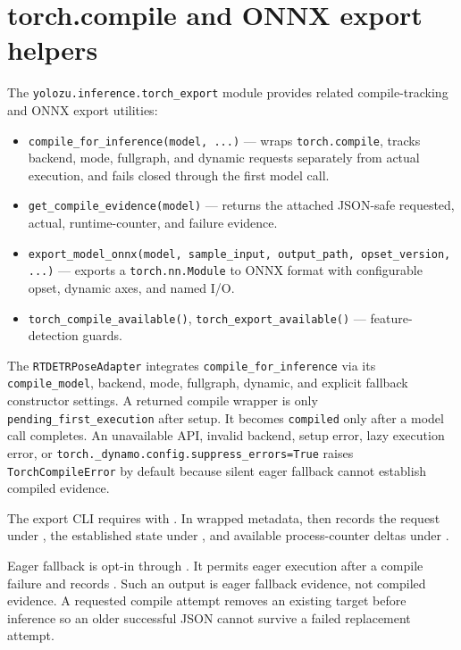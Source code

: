 \section{torch.compile and ONNX export helpers}
The \texttt{yolozu.inference.torch\_export} module provides related compile-tracking and ONNX export utilities:

\begin{itemize}
  \item \texttt{compile\_for\_inference(model, ...)} --- wraps \texttt{torch.compile}, tracks backend, mode, fullgraph, and dynamic requests separately from actual execution, and fails closed through the first model call.
  \item \texttt{get\_compile\_evidence(model)} --- returns the attached JSON-safe requested, actual, runtime-counter, and failure evidence.
  \item \texttt{export\_model\_onnx(model, sample\_input, output\_path, opset\_version, ...)} --- exports a \texttt{torch.nn.Module} to ONNX format with configurable opset, dynamic axes, and named I/O.
  \item \texttt{torch\_compile\_available()}, \texttt{torch\_export\_available()} --- feature-detection guards.
\end{itemize}

The \texttt{RTDETRPoseAdapter} integrates \texttt{compile\_for\_inference} via its \texttt{compile\_model}, backend, mode, fullgraph, dynamic, and explicit fallback constructor settings. A returned compile wrapper is only \texttt{pending\_first\_execution} after setup. It becomes \texttt{compiled} only after a model call completes. An unavailable API, invalid backend, setup error, lazy execution error, or \texttt{torch.\_dynamo.config.suppress\_errors=True} raises \texttt{TorchCompileError} by default because silent eager fallback cannot establish compiled evidence.

The export CLI requires  with . In wrapped metadata,  then  records the request under , the established state under , and available  process-counter deltas under .

Eager fallback is opt-in through . It permits eager execution after a compile failure and records . Such an output is eager fallback evidence, not compiled evidence. A requested compile attempt removes an existing target before inference so an older successful JSON cannot survive a failed replacement attempt.

